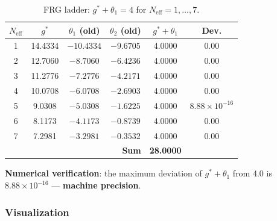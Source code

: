\documentclass[11pt,a4paper]{article}
\theoremstyle{definition}
\begin{document}
\begin{table}[ht]
\centering
\caption{FRG ladder: $g^* + \theta_1 = 4$ for $N_{\text{eff}} = 1, \ldots, 7$.}
\label{tab:frg-ladder-main}
\begin{tabular}{cccccc}
\toprule
$N_{\text{eff}}$ & $g^*$ & $\theta_1$ (old) & $\theta_2$ (old)
& $g^* + \theta_1$ & Dev. \\
\midrule
1 & 14.4334 & $-10.4334$ & $-9.6705$ & 4.0000 & $0.00$ \\
2 & 12.7060 & $-8.7060$  & $-6.4236$ & 4.0000 & $0.00$ \\
3 & 11.2776 & $-7.2776$  & $-4.2171$ & 4.0000 & $0.00$ \\
4 & 10.0708 & $-6.0708$  & $-2.6903$ & 4.0000 & $0.00$ \\
5 & 9.0308  & $-5.0308$  & $-1.6225$ & 4.0000 & $8.88 \times 10^{-16}$ \\
6 & 8.1173  & $-4.1173$  & $-0.8739$ & 4.0000 & $0.00$ \\
7 & 7.2981  & $-3.2981$  & $-0.3532$ & 4.0000 & $0.00$ \\
\midrule
\multicolumn{4}{r}{\textbf{Sum}} & \textbf{28.0000} & \\
\bottomrule
\end{tabular}
\end{table}

\medskip\noindent
\textbf{Numerical verification}: the maximum deviation
of $g^* + \theta_1$ from 4.0 is $8.88 \times 10^{-16}$ ---
\textbf{machine precision}.

\subsubsection{Visualization}
\end{document}
